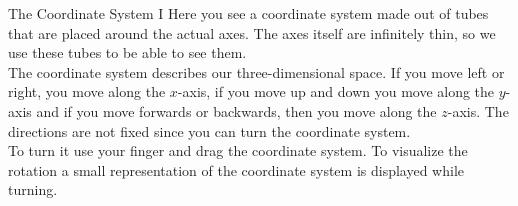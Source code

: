 \begin{surferPage}[Coordinates I]{The Coordinate System I}
Here you see a coordinate system made out of tubes that are placed around the actual axes. The axes itself are infinitely thin, so we use these tubes to be able to see them.\\
The coordinate system describes our three-dimensional space. If you move left or right, you move along the $x$-axis, if you move up and down you move along the $y$-axis and if you move forwards or backwards, then you move along the $z$-axis. The directions are not fixed since you can turn the coordinate system.\\
\vspace{0.3cm}
To turn it use your finger and drag the coordinate system. To visualize the rotation a small representation of the coordinate system is displayed while turning.
\end{surferPage}
